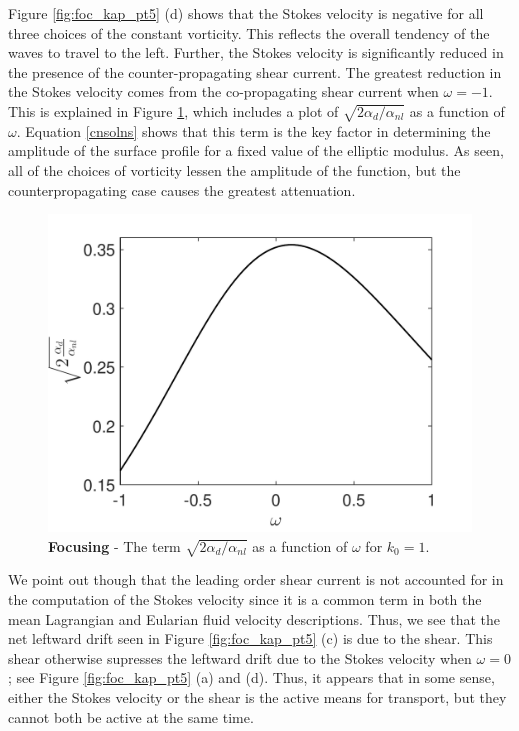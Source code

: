 \documentclass[a4paper,11pt]{article}
\begin{document}
Figure \ref{fig:foc_kap_pt5} (d) shows that the Stokes velocity is negative for all three choices of the constant vorticity.  This reflects the overall tendency of the waves to travel to the left.  Further, the Stokes velocity is significantly reduced in the presence of the counter-propagating shear current.  The greatest reduction in the Stokes velocity comes from the co-propagating shear current when $\omega=-1$.  This is explained in Figure \ref{fig:amfoc}, which includes a plot of $\sqrt{2\alpha_{d}/\alpha_{nl}}$ as a function of $\omega$.  Equation \eqref{cnsolns} shows that this term is the key factor in determining the amplitude of the surface profile for a fixed value of the elliptic modulus.  As seen, all of the choices of vorticity lessen the amplitude of the function, but the counterpropagating case causes the greatest attenuation.  
\begin{figure}
\centering
\includegraphics[width=.48\textwidth]{amp_factor_k0_1_foc}
\caption{{\bf Focusing} - The term $\sqrt{2\alpha_{d}/\alpha_{nl}}$ as a function of $\omega$ for $k_{0}=1$.}
\label{fig:amfoc}
\end{figure}
We point out though that the leading order shear current is not accounted for in the computation of the Stokes velocity since it is a common term in both the mean Lagrangian and Eularian fluid velocity descriptions.  Thus, we see that the net leftward drift seen in Figure \ref{fig:foc_kap_pt5} (c) is due to the shear.  This shear otherwise supresses the leftward drift due to the Stokes velocity when $\omega=0$; see Figure \ref{fig:foc_kap_pt5} (a) and (d).  Thus, it appears that in some sense, either the Stokes velocity or the shear is the active means for transport, but they cannot both be active at the same time.  
\end{document}
